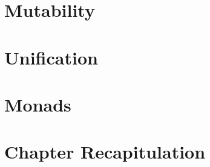 \documentclass[thesis-solanki.tex]{subfiles}
\begin{document}
\section{Mutability}





\section{Unification}



\section{ Monads}





\section{Chapter Recapitulation}

\ifMain
\begin{scope}
  \nolinenumbers
  \enotesize
  \par
  \begin{singlespace}
  \setlength{\parskip}{12pt plus 2pt minus 1pt}
  \theendnotes
  \par
  \end{singlespace}
\end{scope}
\fi
\end{document}
